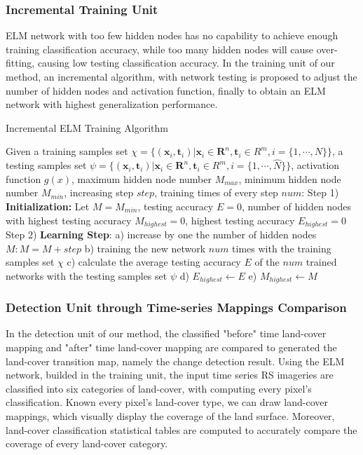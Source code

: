 \documentclass{elsart}
\begin{document}
\subsubsection{Incremental Training Unit}
ELM network with too few hidden nodes has no capability to achieve enough training classification accuracy, while too many hidden nodes will cause over-fitting, causing low testing classification accuracy. 
In the training unit of our method, an incremental algorithm, with network testing is proposed to adjust the number of hidden nodes and activation function, finally to obtain an ELM network with highest generalization performance.
\begin{algorithm}
\caption{Incremental ELM Training Algorithm}
\label{alg1}
\begin{algorithmic}
\REQUIRE Given a training samples set 
$\chi = \{ (\mathbf{x}_i, \mathbf{t}_i) | \mathbf{x}_i \in \mathbf{R}^n, \mathbf{t}_i \in R^m, i=\{1,\cdots,N\}\}$, 
a testing samples set 
$\psi = \{ (\mathbf{x}_i, \mathbf{t}_i) | \mathbf{x}_i \in \mathbf{R}^n, \mathbf{t}_i \in R^m, i=\{1,\cdots,\widehat{N}\}\}$, 
activation function $g(x)$, 
maximum hidden node number $M_{max}$, 
minimum hidden node number $M_{min}$,
increasing step $step$,
training times of every step $num$: 
\STATE Step 1) \textbf{Initialization:} Let $M=M_{min}$, testing accuracy $E=0$, number of hidden nodes with highest testing accuracy $M_{highest} = 0$, highest testing accuracy $E_{highest}=0$
\STATE Step 2) \textbf{Learning Step}:
	\STATE a) increase by one the number of hidden nodes $M: M=M+step$
   	\STATE b) training the new network $num$ times with the training samples set $\chi$
	\STATE c) calculate the average testing accuracy $E$ of the $num$ trained networks with the testing samples set $\psi$
	\STATE d) $E_{highest} \leftarrow E$ 
	\STATE e) $M_{highest} \leftarrow M$
	\ENDIF
	\ENDWHILE
\end{algorithmic}
\end{algorithm}
\par


\subsubsection{Detection Unit through Time-series Mappings Comparison}
In the detection unit of our method, the classified "before" time land-cover mapping and "after" time land-cover mapping are compared to generated the land-cover transition map, namely the change detection result.
Using the ELM network, builded in the training unit, the input time series RS imageries are classified into six categories of land-cover, with computing every pixel's classification.
Known every pixel's land-cover type, we can draw land-cover mappings, which visually display the coverage of the land surface.
Moreover, land-cover classification statistical tables are computed to accurately compare the coverage of every land-cover category.\par
\end{document}
